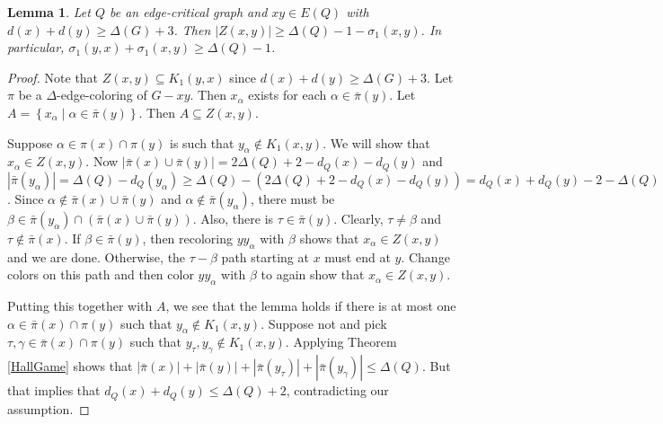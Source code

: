 \documentclass[12pt,reqno]{amsart}
\theoremstyle{plain}
\newtheorem{lem}[thm]{Lemma}
\theoremstyle{definition}
\theoremstyle{remark}
\newcommand{\setbs}[2]{\left\{ #1 \mid #2 \right\}}
\newcommand{\card}[1]{\left|#1\right|}
\newcommand{\parens}[1]{\left( #1 \right)}
\begin{document}
\begin{lem}\label{WoodallEvenMorePsiSubgraphs}
Let $Q$ be an edge-critical graph and $xy \in E(Q)$ with $d(x) + d(y) \ge \Delta(G) + 3$.  Then $\card{Z(x, y)} \ge \Delta(Q) - 1 - \sigma_1(x, y)$.  In particular, $\sigma_1(y,x) + \sigma_1(x,y) \ge \Delta(Q) - 1$.  
\end{lem}
\begin{proof}
Note that $Z(x, y) \subseteq K_1(y, x)$ since $d(x) + d(y) \ge \Delta(G) + 3$.  Let $\pi$ be a $\Delta$-edge-coloring of $G-xy$.  Then $x_\alpha$ exists for each $\alpha \in \bar{\pi}(y)$.  Let $A = \setbs{x_\alpha}{\alpha \in \bar{\pi}(y)}$.  Then $A \subseteq Z(x, y)$.  

Suppose $\alpha \in \pi(x) \cap \pi(y)$ is such that $y_\alpha \not \in K_1(x,y)$. We will show that $x_\alpha \in Z(x,y)$. Now $\card{\bar{\pi}(x) \cup \bar{\pi}(y)} = 2\Delta(Q) + 2 - d_Q(x) - d_Q(y)$ and $\card{\bar{\pi}(y_\alpha)} = \Delta(Q) - d_Q(y_\alpha) \ge \Delta(Q) - (2\Delta(Q) + 2 - d_Q(x) - d_Q(y)) = d_Q(x) + d_Q(y) - 2 - \Delta(Q)$.  Since $\alpha \not \in \bar{\pi}(x) \cup \bar{\pi}(y)$ and $\alpha \not \in \bar{\pi}(y_\alpha)$, there must be $\beta \in \bar{\pi}(y_\alpha) \cap \parens{\bar{\pi}(x) \cup \bar{\pi}(y)}$.  Also, there is $\tau \in \bar{\pi}(y)$.  Clearly, $\tau \ne \beta$ and $\tau \not \in \bar{\pi}(x)$.  If $\beta \in \bar{\pi}(y)$, then recoloring $yy_\alpha$ with $\beta$ shows that $x_\alpha \in Z(x,y)$ and we are done.  Otherwise, the $\tau-\beta$ path starting at $x$ must end at $y$.  Change colors on this path and then color $yy_\alpha$ with $\beta$ to again show that $x_\alpha \in Z(x,y)$.

Putting this together with $A$, we see that the lemma holds if there is at most one $\alpha \in \bar{\pi}(x) \cap \pi(y)$ such that $y_\alpha \not \in K_1(x,y)$.  Suppose not and pick $\tau, \gamma \in \bar{\pi}(x) \cap \pi(y)$ such that $y_\tau, y_\gamma \not \in K_1(x,y)$.  Applying Theorem \ref{HallGame} shows that $\card{\bar{\pi}(x)} + \card{\bar{\pi}(y)} + \card{\bar{\pi}(y_\tau)} + \card{\bar{\pi}(y_\gamma)} \le \Delta(Q)$.  But that implies that $d_Q(x) + d_Q(y) \le \Delta(Q) + 2$, contradicting our assumption.
\end{proof}
\end{document}
